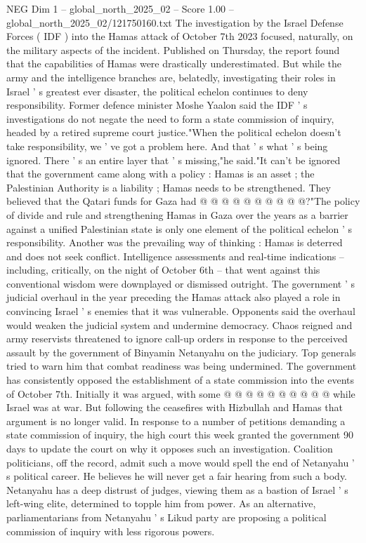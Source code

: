 \begin{textsample}{NEG Dim 1 – global\_north\_2025\_02 – Score 1.00 – global\_north\_2025\_02/121750160.txt}  \label{ex:f1_neg_018}
The investigation by the Israel Defense Forces ( IDF ) into the Hamas attack of October 7th 2023 focused, naturally, on the military aspects of the incident.
Published on Thursday, the report found that the capabilities of Hamas were drastically underestimated.
But while the army and the intelligence branches are, belatedly, investigating their roles in Israel ' s greatest ever disaster, the political echelon continues to deny responsibility.
Former defence minister Moshe Yaalon said the IDF ' s investigations do not negate the need to form a state commission of inquiry, headed by a retired supreme court justice."When the political echelon doesn't take responsibility, we ' ve got a problem here.
And that ' s what ' s being ignored.
There ' s an entire layer that ' s missing,"he said."It can't be ignored that the government came along with a policy : Hamas is an asset ; the Palestinian Authority is a liability ; Hamas needs to be strengthened.
They believed that the Qatari funds for Gaza had @ @ @ @ @ @ @ @ @ @?"The policy of divide and rule and strengthening Hamas in Gaza over the years as a barrier against a unified Palestinian state is only one element of the political echelon ' s responsibility.
Another was the prevailing way of thinking : Hamas is deterred and does not seek conflict.
Intelligence assessments and real-time indications -- including, critically, on the night of October 6th -- that went against this conventional wisdom were downplayed or dismissed outright.
The government ' s judicial overhaul in the year preceding the Hamas attack also played a role in convincing Israel ' s enemies that it was vulnerable.
Opponents said the overhaul would weaken the judicial system and undermine democracy.
Chaos reigned and army reservists threatened to ignore call-up orders in response to the perceived assault by the government of Binyamin Netanyahu on the judiciary.
Top generals tried to warn him that combat readiness was being undermined.
The government has consistently opposed the establishment of a state commission into the events of October 7th.
Initially it was argued, with some @ @ @ @ @ @ @ @ @ @ while Israel was at war.
But following the ceasefires with Hizbullah and Hamas that argument is no longer valid.
In response to a number of petitions demanding a state commission of inquiry, the high court this week granted the government 90 days to update the court on why it opposes such an investigation.
Coalition politicians, off the record, admit such a move would spell the end of Netanyahu ' s political career.
He believes he will never get a fair hearing from such a body.
Netanyahu has a deep distrust of judges, viewing them as a bastion of Israel ' s left-wing elite, determined to topple him from power.
As an alternative, parliamentarians from Netanyahu ' s Likud party are proposing a political commission of inquiry with less rigorous powers.

\end{textsample}
